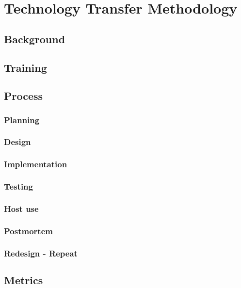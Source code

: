 
\chapter{Technology Transfer Methodology}
\label{sec:method}
\section{Background}
\section{Training}
\section{Process}
\subsection{Planning}
\subsection{Design}
\subsection{Implementation}
\subsection{Testing}
\subsection{Host use}
\subsection{Postmortem}
\subsection{Redesign - Repeat}
\section{Metrics}